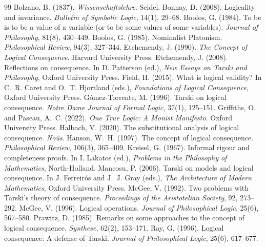 \documentclass{situationist-preprint}
\begin{document}
\begin{thebibliography}{99}\small
{} Bolzano, B. (1837). \emph{Wissenschaftslehre}. Seidel.
 Bonnay, D. (2008). Logicality and invariance. \emph{Bulletin of Symbolic Logic}, 14(1), 29--68.
 Boolos, G. (1984). To be is to be a value of a variable (or to be some values of some variables). \emph{Journal of Philosophy}, 81(8), 430--449.
 Boolos, G. (1985). Nominalist Platonism. \emph{Philosophical Review}, 94(3), 327--344.
 Etchemendy, J. (1990). \emph{The Concept of Logical Consequence}. Harvard University Press.
 Etchemendy, J. (2008). Reflections on consequence. In D. Patterson (ed.), \emph{New Essays on Tarski and Philosophy}, Oxford University Press.
 Field, H. (2015). What is logical validity? In C.~R. Caret and O.~T. Hjortland (eds.), \emph{Foundations of Logical Consequence}, Oxford University Press.
 G\'omez-Torrente, M. (1996). Tarski on logical consequence. \emph{Notre Dame Journal of Formal Logic}, 37(1), 125--151.
 Griffiths, O. and Paseau, A.~C. (2022). \emph{One True Logic: A Monist Manifesto}. Oxford University Press.
 Halbach, V. (2020). The substitutional analysis of logical consequence. \emph{No\^us}.
 Hanson, W.~H. (1997). The concept of logical consequence. \emph{Philosophical Review}, 106(3), 365--409.
 Kreisel, G. (1967). Informal rigour and completeness proofs. In I. Lakatos (ed.), \emph{Problems in the Philosophy of Mathematics}, North-Holland.
 Mancosu, P. (2006). Tarski on models and logical consequence. In J. Ferreir\'os and J.~J. Gray (eds.), \emph{The Architecture of Modern Mathematics}, Oxford University Press.
 McGee, V. (1992). Two problems with Tarski's theory of consequence. \emph{Proceedings of the Aristotelian Society}, 92, 273--292.
 McGee, V. (1996). Logical operations. \emph{Journal of Philosophical Logic}, 25(6), 567--580.
 Prawitz, D. (1985). Remarks on some approaches to the concept of logical consequence. \emph{Synthese}, 62(2), 153--171.
 Ray, G. (1996). Logical consequence: A defense of Tarski. \emph{Journal of Philosophical Logic}, 25(6), 617--677.

\end{thebibliography}
\end{document}
